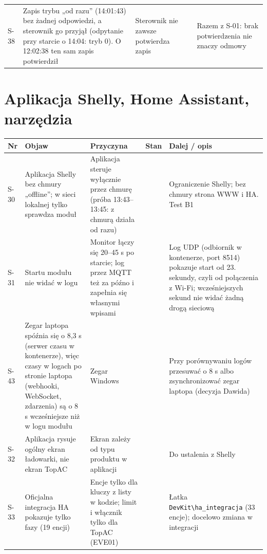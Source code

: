 \documentclass[11pt,a4paper]{article}
\begin{document}
\begin{longtable}{>{\raggedright\arraybackslash}p{3.00cm}>{\raggedright\arraybackslash}p{4.13cm}>{\raggedright\arraybackslash}p{2.33cm}>{\raggedright\arraybackslash}p{0.81cm}>{\raggedright\arraybackslash}p{4.13cm}}
S-38 & Zapis trybu „od razu” (14:01:43) bez żadnej odpowiedzi, a sterownik go przyjął (odpytanie przy starcie o 14:04: tryb 0). O 12:02:38 ten sam zapis potwierdził & Sterownik nie zawsze potwierdza zapis & \leavevmode{\symbolfont\color{apred}\textbf{✘}} & Razem z S-01: brak potwierdzenia nie znaczy odmowy \\
\end{longtable}

\section*{Aplikacja Shelly, Home Assistant, narzędzia}

\begin{longtable}{>{\raggedright\arraybackslash}p{3.00cm}>{\raggedright\arraybackslash}p{4.04cm}>{\raggedright\arraybackslash}p{2.99cm}>{\raggedright\arraybackslash}p{0.81cm}>{\raggedright\arraybackslash}p{3.56cm}}
\toprule
\rowcolor{apteallight}\textbf{Nr} & \textbf{Objaw} & \textbf{Przyczyna} & \textbf{Stan} & \textbf{Dalej / opis} \\
\midrule\endhead
\bottomrule\endfoot
S-30 & Aplikacja Shelly bez chmury „offline”; w sieci lokalnej tylko sprawdza moduł & Aplikacja steruje wyłącznie przez chmurę (próba 13:43–13:45: z chmurą działa od razu) & \leavevmode{\symbolfont\color{apred}\textbf{✘}} & Ograniczenie Shelly; bez chmury strona WWW i HA. Test B1 \\
S-31 & Startu modułu nie widać w logu & Monitor łączy się 20–45 s po starcie; log przez MQTT też za późno i zapełnia się własnymi wpisami & \leavevmode{\symbolfont\color{apamber}\textbf{◐}} & Log UDP (odbiornik w kontenerze, port 8514) pokazuje start od 23. sekundy, czyli od połączenia z Wi-Fi; wcześniejszych sekund nie widać żadną drogą sieciową \\
S-43 & Zegar laptopa spóźnia się o 8,3 s (serwer czasu w kontenerze), więc czasy w logach po stronie laptopa (webhooki, WebSocket, zdarzenia) są o 8 s wcześniejsze niż w logu modułu & Zegar Windows & \leavevmode{\symbolfont\color{apamber}\textbf{◐}} & Przy porównywaniu logów przesuwać o 8 s albo zsynchronizować zegar laptopa (decyzja Dawida) \\
S-32 & Aplikacja rysuje ogólny ekran ładowarki, nie ekran TopAC & Ekran zależy od typu produktu w aplikacji & \leavevmode{\symbolfont\color{apred}\textbf{✘}} & Do ustalenia z Shelly \\
S-33 & Oficjalna integracja HA pokazuje tylko fazy (19 encji) & Encje tylko dla kluczy z listy w kodzie; limit i włącznik tylko dla TopAC (EVE01) & \leavevmode{\symbolfont\color{apamber}\textbf{◐}} & Łatka \texttt{DevKit\textbackslash{}ha\_\allowbreak{}integracja} (33 encje); docelowo zmiana w integracji \\

\end{longtable}
\end{document}
